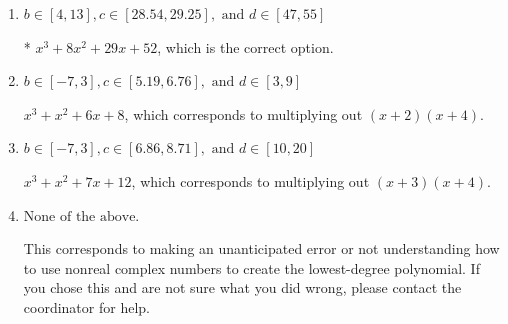 \documentclass{extbook}[14pt]
\begin{document}
\begin{enumerate}
{\begin{enumerate}[label=\Alph*.]
$x^{3} -8 x^{2} +29 x -52$, which corresponds to multiplying out $(x-(-2 - 3 i))(x-(-2 + 3 i))(x -4)$.
\item \( b \in [4, 13], c \in [28.54, 29.25], \text{ and } d \in [47, 55] \)

* $x^{3} +8 x^{2} +29 x + 52$, which is the correct option.
\item \( b \in [-7, 3], c \in [5.19, 6.76], \text{ and } d \in [3, 9] \)

$x^{3} + x^{2} +6 x + 8$, which corresponds to multiplying out $(x + 2)(x + 4)$.
\item \( b \in [-7, 3], c \in [6.86, 8.71], \text{ and } d \in [10, 20] \)

$x^{3} + x^{2} +7 x + 12$, which corresponds to multiplying out $(x + 3)(x + 4)$.
\item \( \text{None of the above.} \)

This corresponds to making an unanticipated error or not understanding how to use nonreal complex numbers to create the lowest-degree polynomial. If you chose this and are not sure what you did wrong, please contact the coordinator for help.
\end{enumerate}

}
\end{enumerate}
\end{document}

